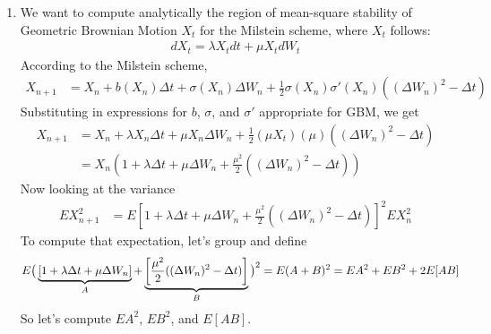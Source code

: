 \documentclass[12pt]{article}
\theoremstyle{plain}
\theoremstyle{definition}
\theoremstyle{remark}
\begin{document}
\begin{enumerate}
  \item %
    We want to compute analytically the region of mean-square stability
    of Geometric Brownian Motion $X_t$ for the Milstein scheme, where
    $X_t$ follows:
    \begin{align*}
      dX_t = \lambda X_t dt + \mu X_t dW_t
    \end{align*}
    According to the Milstein scheme,
    \begin{align*}
      X_{n+1} &=
        X_n + b(X_n)\Delta t + \sigma(X_n) \Delta W_n
        + \frac{1}{2}\sigma(X_n) \sigma'(X_n) ( (\Delta W_n)^2-\Delta t)
    \end{align*}
    Substituting in expressions for $b$, $\sigma$, and $\sigma'$
    appropriate for GBM, we get
    \begin{align*}
      X_{n+1} &=
        X_n + \lambda X_n \Delta t + \mu X_n \Delta W_n
        + \frac{1}{2}(\mu X_t) (\mu) ( (\Delta W_n)^2-\Delta t)\\
      &=
        X_n\left(1 + \lambda \Delta t + \mu \Delta W_n
        + \frac{\mu^2}{2} ((\Delta W_n)^2-\Delta t)\right)
    \end{align*}
    Now looking at the variance
    \begin{align*}
      EX_{n+1}^2
      &=
        E\left[ 1 + \lambda \Delta t + \mu \Delta W_n
        + \frac{\mu^2}{2} ((\Delta W_n)^2-\Delta t)\right]^2 EX_n^2
    \end{align*}
    To compute that expectation, let's group and define
    \begin{align*}
        E\big(
          \underbrace{%
            \left[ 1 + \lambda \Delta t + \mu \Delta W_n\right]
          }_{A}
        + \underbrace{%
            \left[\frac{\mu^2}{2} ((\Delta W_n)^2-\Delta t)\right]
          }_{B}
        \big)^2
        &= E(A+B)^2 = EA^2 + EB^2 + 2E[AB]
    \end{align*}
    So let's compute $EA^2$, $EB^2$, and $E[AB]$.


\end{enumerate}
\end{document}
